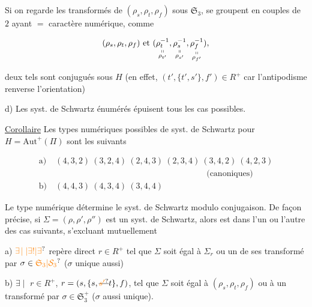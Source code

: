

Si on regarde les  transformés de $(\rho_s,\rho_t,\rho_f)$ sous $\mathfrak S_3$, se groupent en couples de $2$ ayant $=$ caractère numérique, comme

\[
(\rho_s,\rho_t,\rho_f)\text{ et }
(\underset{\substack{\shortparallel\\\rho_{t'}}}{\rho_t^{-1}},
 \underset{\substack{\shortparallel\\\rho_{s'}}}{\rho_s^{-1}},
 \underset{\substack{\shortparallel\\\rho_{f'}}}{\rho_f^{-1}}),
\]

deux tels sont conjugués sous $H$ (en effet, $(t',\{t',s'\},f')\in R^{+}$ car l'antipodisme renverse l'orientation)

d) Les syst. de Schwartz énumérés épuisent tous les cas possibles.


\uline{Corollaire} Les types numériques possibles de syst. de Schwartz pour $H=\mathrm{Aut}^{+}(\Pi)$ sont les suivants

\[
\begin{aligned}
\text{a)}\ &(4,3,2)\ (3,2,4)\ (2,4,3)\ (2,3,4)\ (3,4,2)\ (4,2,3)\\
&\hspace{18em}\text{(canoniques)}\\
\text{b)}\ &(4,4,3)\ (4,3,4)\ (3,4,4)
\end{aligned}
\]

Le type numérique détermine le syst. de Schwartz modulo conjugaison. De façon précise, si $\Sigma=(\rho,\rho',\rho'')$ est un syst. de Schwartz, alors  est dans l'un ou l'autre des cas suivants, s'excluant mutuellement

a) $\unsure{\exists\!\mid|\exists!|\exists}$ repère direct $r\in R^{+}$  tel que $\Sigma$ soit égal à $\Sigma_r$ ou un de ses transformé par $\sigma\in\unsure{\mathfrak S_3|\mathcal S_3}$ ($\sigma$ unique aussi)

b) $\exists\!\mid$  $r\in R^{+}$, $r=(s,\{s,\deleted{\unsure{s'}}t\},f)$,  tel que $\Sigma$ soit égal à $(\rho_s,\rho_t,\rho_f)$ ou à un transformé par $\sigma\in\mathfrak S_3^{+}$ ($\sigma$ aussi unique).

